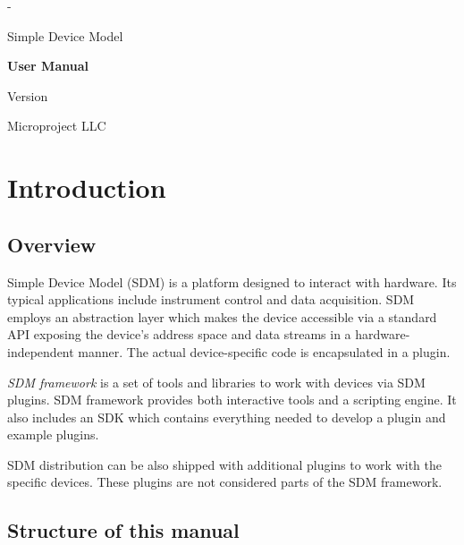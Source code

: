 \documentclass[a4paper,12pt,twoside,extrafontsizes]{memoir}
\begin{document}
\begin{titlingpage}
\calccentering{\unitlength}
\begin{adjustwidth*}{\unitlength}{-\unitlength}
	\vspace*{\fill}
	\begin{center}
	\DoubleSpacing
	\huge Simple Device Model\par
	\vspace{\onelineskip}
	\LARGE \textbf{User Manual}\par
	\vspace{1.2\onelineskip}
	\large Version \productversion\par
	Microproject LLC
	\end{center}
	\vspace*{\fill}
\end{adjustwidth*}
\end{titlingpage}


\tableofcontents*

\chapter{Introduction}

\section{Overview}

Simple Device Model (SDM) is a platform designed to interact with hardware. Its typical applications include instrument control and data acquisition. SDM employs an abstraction layer which makes the device accessible via a standard API exposing the device's address space and data streams in a hardware-independent manner. The actual device-specific code is encapsulated in a plugin.

\emph{SDM framework} is a set of tools and libraries to work with devices via SDM plugins. SDM framework provides both interactive tools and a scripting engine. It also includes an SDK which contains everything needed to develop a plugin and example plugins.

SDM distribution can be also shipped with additional plugins to work with the specific devices. These plugins are not considered parts of the SDM framework.

\section{Structure of this manual}
\end{document}
